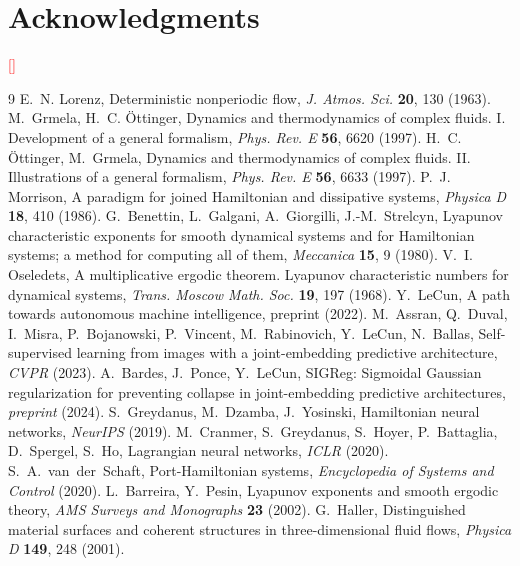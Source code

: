 \documentclass[journal]{IEEEtran}
\newcommand{\FILL}[1]{\textcolor{red}{[#1]}}
\begin{document}
\section*{Acknowledgments}
\FILL{}

\begin{thebibliography}{9}
 E.~N. Lorenz, Deterministic nonperiodic flow, \emph{J. Atmos. Sci.} \textbf{20}, 130 (1963).
 M.~Grmela, H.~C. \"Ottinger, Dynamics and thermodynamics of complex fluids. I. Development of a general formalism, \emph{Phys. Rev. E} \textbf{56}, 6620 (1997).
 H.~C. \"Ottinger, M.~Grmela, Dynamics and thermodynamics of complex fluids. II. Illustrations of a general formalism, \emph{Phys. Rev. E} \textbf{56}, 6633 (1997).
 P.~J. Morrison, A paradigm for joined Hamiltonian and dissipative systems, \emph{Physica D} \textbf{18}, 410 (1986).
 G.~Benettin, L.~Galgani, A.~Giorgilli, J.-M.~Strelcyn, Lyapunov characteristic exponents for smooth dynamical systems and for Hamiltonian systems; a method for computing all of them, \emph{Meccanica} \textbf{15}, 9 (1980).
 V.~I. Oseledets, A multiplicative ergodic theorem. Lyapunov characteristic numbers for dynamical systems, \emph{Trans. Moscow Math. Soc.} \textbf{19}, 197 (1968).
 Y.~LeCun, A path towards autonomous machine intelligence, preprint (2022).
 M.~Assran, Q.~Duval, I.~Misra, P.~Bojanowski, P.~Vincent, M.~Rabinovich, Y.~LeCun, N.~Ballas, Self-supervised learning from images with a joint-embedding predictive architecture, \emph{CVPR} (2023).
 A.~Bardes, J.~Ponce, Y.~LeCun, SIGReg: Sigmoidal Gaussian regularization for preventing collapse in joint-embedding predictive architectures, \emph{preprint} (2024).
 S.~Greydanus, M.~Dzamba, J.~Yosinski, Hamiltonian neural networks, \emph{NeurIPS} (2019).
 M.~Cranmer, S.~Greydanus, S.~Hoyer, P.~Battaglia, D.~Spergel, S.~Ho, Lagrangian neural networks, \emph{ICLR} (2020).
 S.~A.~van~der~Schaft, Port-Hamiltonian systems, \emph{Encyclopedia of Systems and Control} (2020).
 L.~Barreira, Y.~Pesin, Lyapunov exponents and smooth ergodic theory, \emph{AMS Surveys and Monographs} \textbf{23} (2002).
 G.~Haller, Distinguished material surfaces and coherent structures in three-dimensional fluid flows, \emph{Physica D} \textbf{149}, 248 (2001).

\end{thebibliography}
\end{document}
